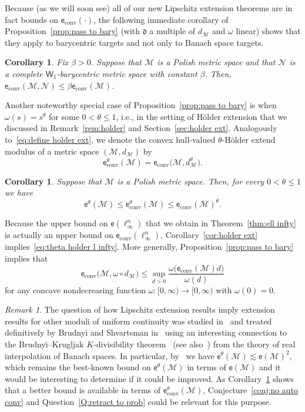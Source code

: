 \documentclass[11pt,reqno]{amsart}
\renewcommand{\le}{\leqslant}
\newcommand{\NN}{\mathcal{N}}
\newtheorem{corollary}[theorem]{Corollary}
\theoremstyle{remark}
\newtheorem{remark}[theorem]{Remark}
\newcommand{\MM}{\mathcal{M}}
\newcommand{\W}{\mathsf{W}}
\newcommand{\ee}{\mathsf{e}}
\renewcommand{\1}{\mathbf 1}
\newcommand{\conv}{\mathrm{conv}}
\begin{document}
Because (as we will soon see) all of our new  Lipschitz extension theorems are in fact bounds on $\ee_\conv(\cdot)$, the following immediate corollary of Proposition~\ref{prop:pass to bary} (with $\mathfrak{d}$ a multiple of $d_\MM$ and $\omega$ linear) shows that they apply to barycentric targets and not only to Banach space targets.
\begin{corollary} Fix $\beta>0$. Suppose that $\MM$ is a Polish metric space and that $\NN$ is a complete $\W_1$-barycentric metric space with constant $\beta$. Then, $\ee_\conv(\MM,\NN)\le \beta \ee_\conv(\MM)$.
\end{corollary}

Another noteworthy special case of Proposition~\ref{prop:pass to bary} is when $\omega(s)=s^\theta$ for some $0<\theta\le 1$, i.e., in the setting of H\"older extension that we discussed in Remark~\ref{rem:holder}  and Section~\ref{sec:holder ext}. Analogously to~\eqref{eq:define holder ext}, we
denote the convex hull-valued $\theta$-H\"older extend modulus of a metric space $(\MM,d_\MM)$ by
$$
\ee_\conv^\theta(\MM)=\ee_\conv\big(\MM,d_\MM^\theta\big).
$$


\begin{corollary}\label{cor:holder ext} Suppose that $\MM$ is a Polish metric space. Then, for every $0<\theta\le 1$ we have
$$
\ee^\theta(\MM)\le \ee^\theta_\conv(\MM)\le \ee_\conv(\MM)^\theta.
$$
\end{corollary}
Because the upper bound on $\ee(\ell_\infty^n)$ that we obtain in Theorem~\ref{thm:ell infty} is actually an upper bound on $\ee_\conv(\ell_\infty^n)$, Corollary~\eqref{cor:holder ext} implies~\eqref{eq:theta holder l infty}. More generally, Proposition~\ref{prop:pass to bary} implies that
$$
\ee_\conv\big(\MM,\omega\circ d_\MM\big)\le \sup_{d>0}\frac{\omega\big(\ee_\conv(\MM)d\big)}{\omega(d)}
$$
for any concave nondecreasing function $\omega:[0,\infty)\to [0,\infty)$ with $\omega(0)=0$.
\begin{remark}\label{rem:if vartheta}
The question of how Lipschitz extension results imply extension results for other moduli of uniform continuity was studied in~\cite{Nao01} and treated definitively by Brudnyi and Shvartsman in~\cite{BS02} using an interesting connection to the Brudny\u{\i}--Krugljak $K$-divisibility theorem~\cite{BK81} (see also~\cite{Cwi84}) from the theory of real interpolation of Banach spaces. In particular, by~\cite{BS02} we have $\ee^\theta(\MM)\lesssim \ee(\MM)^2$, which remains the best-known bound on $\ee^\theta(\MM)$ in terms of $\ee(\MM)$ and it would be interesting to determine if it could be improved. As Corollary~\ref{cor:holder ext}  shows that a better bound is available in terms of $\ee_\conv^\theta(\MM)$, Conjecture~\ref{conj:no auto conv} and Question~\ref{Q:retract to prob} could be relevant for this purpose.
\end{remark}
\end{document}
